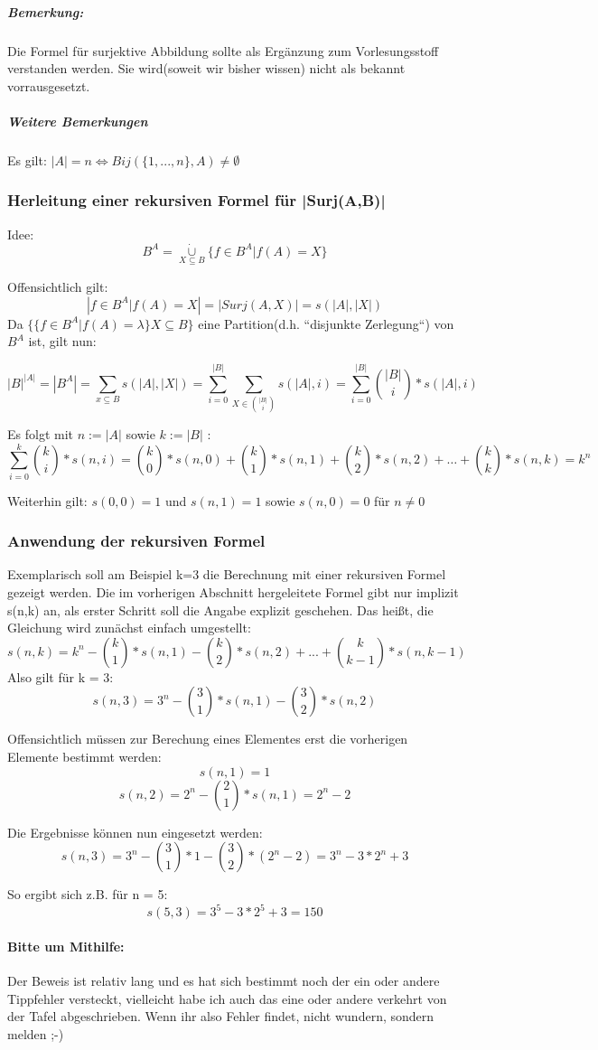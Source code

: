 \subparagraph*{Bemerkung:} Die Formel für surjektive Abbildung sollte als Ergänzung zum Vorlesungsstoff verstanden werden. 
Sie wird(soweit wir bisher wissen) nicht als bekannt vorrausgesetzt.

\subparagraph{Weitere Bemerkungen}
Es gilt:
$ |A| = n \Longleftrightarrow Bij( \{1, ... , n\},A) \neq \emptyset$

\subsubsection{Herleitung einer rekursiven Formel für |Surj(A,B)| }
Idee: $$ B^A =  \underset {{X}\subseteq{B}} {\mathbin{\dot{\cup}}} {\{ f\in B^A | f(A) = X \}} $$

Offensichtlich gilt: $$ | {f \in B^A | f(A) = X} | = |Surj(A,X)| = s(|A|, |X|) $$
Da $ \{ \{f \in B^A | f(A) = \lambda \} X \subseteq B \} $ eine Partition(d.h. ``disjunkte Zerlegung``) von $B^A$ ist, gilt nun:

$$ {|B|}^{|A|} = |{B}^{A}| = \sum_{x \subseteq B} s(|A|,|X|) 
= \sum_{i = 0}^{|B|} \sum_{X \in  {{|B|}\choose{i}} } s(|A|,i) = 
\sum_{i = 0}^{|B|}   {{|B|}\choose{i}} *  s(|A|,i)
$$

Es folgt mit $n:=|A|$ sowie $k:=|B|$ : 
$$ \sum_{i = 0}^{k}   {{k}\choose{i}} *  s(n,i)  = 
{{k}\choose{0}} * s(n,0) + {{k}\choose{1}} * s(n,1) + {{k}\choose{2}} * s(n,2) + \dots + {{k}\choose{k}} * s(n,k) = k^n $$

Weiterhin gilt: $ s(0,0) = 1 $ und $s(n,1)=1$ sowie $ s(n,0)=0 $ für $ {n}\neq{0} $

\subsubsection{Anwendung der rekursiven Formel}
Exemplarisch soll am Beispiel k=3 die Berechnung mit einer rekursiven Formel gezeigt werden.
Die im vorherigen Abschnitt hergeleitete Formel gibt nur implizit s(n,k) an, als erster Schritt soll die Angabe explizit geschehen.
Das heißt, die Gleichung wird zunächst einfach umgestellt:
$$ s(n,k) = k^n - {{k}\choose{1}} * s(n,1) - {{k}\choose{2}} * s(n,2) + ... + {{k}\choose{k-1}} * s(n,k-1) $$
Also gilt für k = 3:
$$ s(n,3) = 3^n - {{3}\choose{1}} * s(n,1) - {{3}\choose{2}} * s(n,2) $$

Offensichtlich müssen zur Berechung eines Elementes erst die vorherigen Elemente bestimmt werden:
$$ s(n,1) = 1$$
$$ s(n,2) = 2^n - {{2}\choose{1}} * s(n,1) = 2^n -2 $$

Die Ergebnisse können nun eingesetzt werden:
$$ s(n,3) = 3^n - {{3}\choose{1}} * 1 - {{3}\choose{2}} * (2^n -2) = 3^n - 3 * 2^n + 3 $$

So ergibt sich z.B. für n = 5:
$$ s(5,3) = 3^5 - 3 * 2^5 + 3 = 150 $$

\paragraph{Bitte um Mithilfe:} Der Beweis ist relativ lang und es hat sich bestimmt noch der ein oder andere Tippfehler versteckt, vielleicht habe ich auch 
das eine oder andere verkehrt von der Tafel abgeschrieben. Wenn ihr also Fehler findet, nicht wundern, sondern melden ;-) 